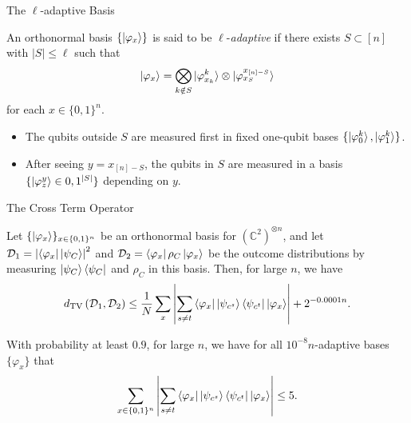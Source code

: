 \begin{frame}{The $\ell$-adaptive Basis}
\begin{definition}
An orthonormal basis $\{\ket{\varphi_x}\}$ is said to be $\ell$-\textit{adaptive} if there exists $S\subset[n]$ with $|S|\le\ell$ such that
\begin{align*}
\ket{\varphi_x}=\bigotimes_{k\notin S}\ket{\varphi^k_{x_k}}\otimes\ket{\varphi^{x_{[n]-S}}_{x_S}}
\end{align*}
for each $x\in\{0,1\}^n$.
\end{definition}
\begin{itemize}
\item
The qubits outside $S$ are measured first in fixed one-qubit bases $\{\ket{\varphi^k_0},\ket{\varphi^k_1}\}$.
\item
After seeing $y=x_{[n]-S}$, the qubits in $S$ are measured in a basis $\{\ket{\varphi^y_z}\in{0,1}^{|S|}\}$ depending on $y$.
\end{itemize}

\end{frame}

\begin{frame}{The Cross Term Operator}
\begin{lemma}
Let $\{\ket{\varphi_x}\}_{x\in\{0,1\}^n}$ be an orthonormal basis for $(\mathbb{C}^2)^{\otimes n}$, and let $\mathcal{D}_1=\left|\bra{\varphi_x}\ket{\psi_C}\right|^2$ and $\mathcal{D}_2=\bra{\varphi_x}\rho_C\ket{\varphi_x}$ be the outcome distributions by measuring $\ket{\psi_C}\bra{\psi_C}$ and $\rho_C$ in this basis.
Then, for large $n$, we have
\begin{align*}
d_{\mathrm{TV}}\left(\mathcal{D}_1,\mathcal{D}_2\right)\le\frac{1}{N}\sum_{x}\left|\sum_{s\neq t}\bra{\varphi_x}\ket{\psi_{c^s}}\bra{\psi_{c^t}}\ket{\varphi_{x}}\right|+2^{-0.0001n}.
\end{align*}
\end{lemma}

\begin{lemma}
With probability at least $0.9$, for large $n$, we have for all $10^{-8}n$-adaptive bases $\{\varphi_x\}$ that
\begin{align*}
\sum_{x\in\{0,1\}^n}\left|\sum_{s\neq t}\bra{\varphi_x}\ket{\psi_{c^s}}\bra{\psi_{c^t}}\ket{\varphi_{x}}\right|\le5.
\end{align*}
\end{lemma}
\end{frame}

